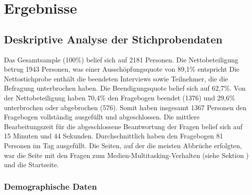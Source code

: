 %
%
\let\raggedsection\centering 
\chapter{Ergebnisse}
\let\raggedsection\raggedright 
\glsresetall
\section{Deskriptive Analyse der Stichprobendaten}
\label{label.stichprobe}
Das Gesamtsample (100\%) belief sich auf 2181 Personen. Die Nettobeteiligung betrug 1943 Personen, was einer Ausschöpfungsquote von 89,1\% entspricht Die Nettostichprobe enthält die beendeten Interviews sowie Teilnehmer, die die Befragung unterbrochen haben. Die Beendigungsquote belief sich auf 62,7\%. Von der Nettobeteiligung haben 70,4\% den Fragebogen beendet (1376) und 29,6\% unterbrochen oder abgebrochen (576). Somit haben insgesamt 1367 Personen den Fragebogen vollständig ausgefüllt und abgeschlossen. Die mittlere Bearbeitungszeit für die abgeschlossene Beantwortung der Fragen belief sich auf 15 Minuten und 44 Sekunden. Durchschnittlich haben den Fragebogen 81 Personen im Tag ausgefüllt. Die Seiten, auf der die meisten Abbrüche erfolgten, war die Seite mit den Fragen zum Medien-Multitasking-Verhalten (siehe  Sektion ) und die Startseite. 
\subsection{Demographische Daten}
